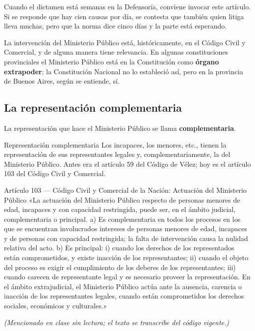 \documentclass[12pt,oneside]{book}
\begin{document}
Cuando el dictamen está semanas en la Defensoría, conviene invocar este artículo. Si se responde que hay cien causas por día, se contesta que también quien litiga lleva muchas, pero que la norma dice cinco días y la parte está esperando.

La intervención del Ministerio Público está, históricamente, en el Código Civil y Comercial, y de alguna manera tiene relevancia. En algunas constituciones provinciales el Ministerio Público está en la Constitución como \textbf{órgano extrapoder}; la Constitución Nacional no lo estableció así, pero en la provincia de Buenos Aires, según se entiende, sí.

\subsection{La representación complementaria}

La representación que hace el Ministerio Público se llama \textbf{complementaria}.

\begin{definition}{Representación complementaria}
Los incapaces, los menores, etc., tienen la representación de sus representantes legales y, complementariamente, la del Ministerio Público. Antes era el artículo 59 del Código de Vélez; hoy es el artículo 103 del Código Civil y Comercial.
\end{definition}

\begin{norma}{Artículo 103 --- Código Civil y Comercial de la Nación: Actuación del Ministerio Público}
«La actuación del Ministerio Público respecto de personas menores de edad, incapaces y con capacidad restringida, puede ser, en el ámbito judicial, complementaria o principal. a) Es complementaria en todos los procesos en los que se encuentran involucrados intereses de personas menores de edad, incapaces y de personas con capacidad restringida; la falta de intervención causa la nulidad relativa del acto. b) Es principal: i) cuando los derechos de los representados están comprometidos, y existe inacción de los representantes; ii) cuando el objeto del proceso es exigir el cumplimiento de los deberes de los representantes; iii) cuando carecen de representante legal y es necesario proveer la representación. En el ámbito extrajudicial, el Ministerio Público actúa ante la ausencia, carencia o inacción de los representantes legales, cuando están comprometidos los derechos sociales, económicos y culturales.»

\textit{(Mencionado en clase sin lectura; el texto se transcribe del código vigente.)}
\end{norma}
\end{document}
